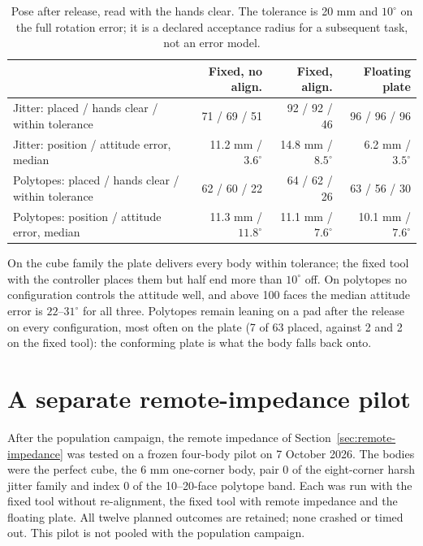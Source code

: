 \begin{table}[htbp]\centering\small
\begin{tabular}{@{}lrrr@{}}\toprule
 & Fixed, no align. & Fixed, align. & Floating plate\\
\midrule
Jitter: placed / hands clear / within tolerance & 71 / 69 / 51 & 92 / 92 / 46 & 96 / 96 / 96\\
Jitter: position / attitude error, median & 11.2 mm / $3.6^\circ$ & 14.8 mm / $8.5^\circ$ & 6.2 mm / $3.5^\circ$\\
Polytopes: placed / hands clear / within tolerance & 62 / 60 / 22 & 64 / 62 / 26 & 63 / 56 / 30\\
Polytopes: position / attitude error, median & 11.3 mm / $11.8^\circ$ & 11.1 mm / $7.6^\circ$ & 10.1 mm / $7.6^\circ$\\
\bottomrule\end{tabular}
\caption{Pose after release, read with the hands clear. The tolerance is 20 mm and $10^\circ$ on the full rotation error; it is a declared acceptance radius for a subsequent task, not an error model.}
\label{tab:geo-placement}
\end{table}

On the cube family the plate delivers every body within tolerance; the fixed tool with the controller places them but half end more than $10^\circ$ off. On polytopes no configuration controls the attitude well, and above 100 faces the median attitude error is $22$--$31^\circ$ for all three. Polytopes remain leaning on a pad after the release on every configuration, most often on the plate (7 of 63 placed, against 2 and 2 on the fixed tool): the conforming plate is what the body falls back onto.

\section{A separate remote-impedance pilot}
\label{sec:rcc-pilot}

After the population campaign, the remote impedance of Section~\ref{sec:remote-impedance} was tested on a frozen four-body pilot on 7 October 2026. The bodies were the perfect cube, the 6 mm one-corner body, pair 0 of the eight-corner harsh jitter family and index 0 of the 10--20-face polytope band. Each was run with the fixed tool without re-alignment, the fixed tool with remote impedance and the floating plate. All twelve planned outcomes are retained; none crashed or timed out. This pilot is not pooled with the population campaign.

